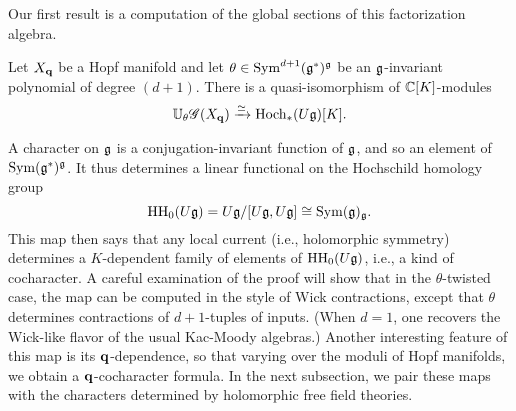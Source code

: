 Our first result is a computation of the global sections of this factorization algebra.  

\begin{prop}
\label{prop: hopf}
Let $X_{\bf q}$ be a Hopf manifold and let $\theta \in {\rm Sym}^{d+1}(\mathfrak g^*)^\mathfrak g$ be an $\mathfrak g$-invariant polynomial of degree $(d+1)$. 
There is a quasi-isomorphism of $\mathbb C[K]$-modules
\[
\mathbb U_\theta \mathscr G (X_{\bf q}) \xrightarrow{\simeq} {\rm Hoch}_*(U \mathfrak g)[K] .
\]
\end{prop}


\begin{rmk}
A character on $\mathfrak g$ is a conjugation-invariant function of $\mathfrak g$, and so an element of ${\rm Sym}(\mathfrak g^*)^\mathfrak g$.
It thus determines a linear functional on the Hochschild homology group 
\[
{\rm HH}_0(U\mathfrak g) = U\mathfrak g/[U\mathfrak g,U\mathfrak g] \cong {\rm Sym}(\mathfrak g)_\mathfrak g.
\]
This map then says that any local current (i.e., holomorphic symmetry) determines a $K$-dependent family of elements of ${\rm HH}_0(U\mathfrak g)$, i.e., a kind of cocharacter.
A careful examination of the proof will show that in the $\theta$-twisted case, 
the map can be computed in the style of Wick contractions, except that $\theta$ determines contractions of $d+1$-tuples of inputs.
(When $d=1$, one recovers the Wick-like flavor of the usual Kac-Moody algebras.)
Another interesting feature of this map is its ${\bf q}$-dependence,
so that varying over the moduli of Hopf manifolds, we obtain a ${\bf q}$-cocharacter formula.
In the next subsection, we pair these maps with the characters determined by holomorphic free field theories.
\end{rmk}

